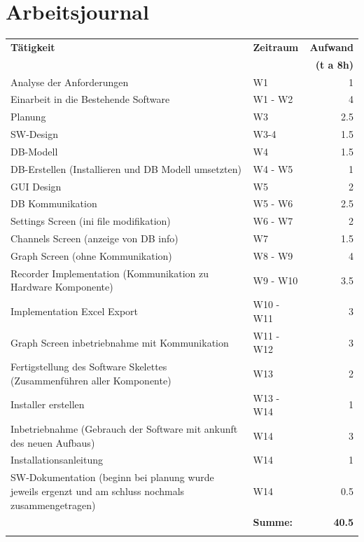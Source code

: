\documentclass[10pt]{scrartcl}
\begin{document}
\section{Arbeitsjournal}
\begin{center}
	\begin{tabular}{p{6cm} | l | r}
		\textbf{Tätigkeit} & \textbf{Zeitraum} & \textbf{Aufwand} \\ &&\textbf{(t a 8h)}\\
		\hline Analyse der Anforderungen & W1 & 1 \\
		\hline Einarbeit in die Bestehende Software & W1 - W2 & 4 \\
		\hline Planung & W3 & 2.5 \\
		\hline SW-Design & W3-4 & 1.5 \\
		\hline DB-Modell & W4 & 1.5 \\
		\hline DB-Erstellen (Installieren und DB Modell umsetzten) & W4 - W5 & 1 \\
		\hline GUI Design & W5 & 2 \\
		\hline DB Kommunikation & W5 - W6 & 2.5 \\
		\hline Settings Screen (ini file modifikation) & W6 - W7 & 2 \\
		\hline Channels Screen (anzeige von DB info) & W7 & 1.5 \\
		\hline Graph Screen (ohne Kommunikation) & W8 - W9 & 4 \\
		\hline Recorder Implementation (Kommunikation zu Hardware Komponente) & W9 - W10 & 3.5 \\
		\hline Implementation Excel Export & W10 - W11 & 3 \\
		\hline Graph Screen inbetriebnahme mit Kommunikation & W11 - W12 & 3 \\
		\hline Fertigstellung des Software Skelettes (Zusammenführen aller Komponente) & W13 & 2 \\
		\hline Installer erstellen & W13 - W14 & 1 \\
		\hline Inbetriebnahme (Gebrauch der Software mit ankunft des neuen Aufbaus) & W14 & 3 \\
		\hline Installationsanleitung & W14 & 1 \\
		\hline SW-Dokumentation (beginn bei planung wurde jeweils ergenzt und am schluss nochmals zusammengetragen) & W14 & 0.5 \\\hhline{~--}
		& \textbf{Summe:} & \textbf{40.5} \\\hhline{~~=}
	\end{tabular}	
\end{center}
\end{document}
